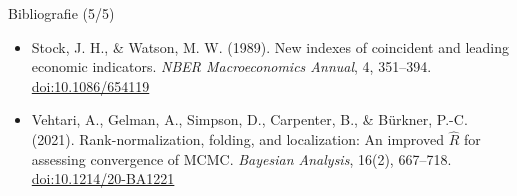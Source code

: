 \begin{frame}{Bibliografie (5/5)}
\begin{itemize}
    \item Stock, J. H., \& Watson, M. W. (1989). New indexes of coincident and leading economic indicators. \textit{NBER Macroeconomics Annual}, 4, 351--394. \href{https://doi.org/10.1086/654119}{doi:10.1086/654119}
    \item Vehtari, A., Gelman, A., Simpson, D., Carpenter, B., \& Bürkner, P.-C. (2021). Rank-normalization, folding, and localization: An improved $\widehat{R}$ for assessing convergence of MCMC. \textit{Bayesian Analysis}, 16(2), 667--718. \href{https://doi.org/10.1214/20-BA1221}{doi:10.1214/20-BA1221}
\end{itemize}
\end{frame}



